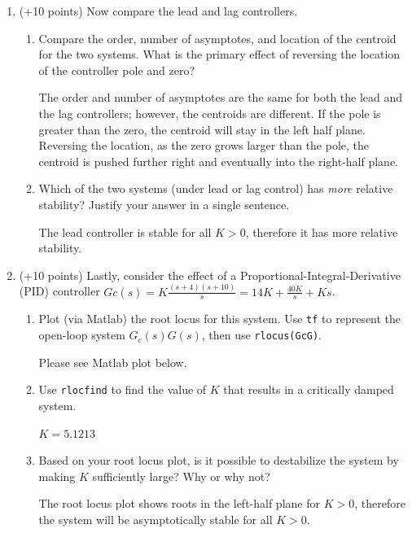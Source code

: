 \documentclass[11pt]{article}
\begin{document}
\begin{enumerate}
    \item (+10 points) Now compare the lead and lag controllers.
        \begin{enumerate}
            \item Compare the order, number of asymptotes, and location of the centroid for the two systems. What is the primary effect of reversing the location of the controller pole and zero?\par
            \color{CrispBlue}
            The order and number of asymptotes are the same for both the lead and the lag controllers; however, the centroids are different. If the pole is greater than the zero, the centroid will stay in the left half plane. Reversing the location, as the zero grows larger than the pole, the centroid is pushed further right and eventually into the right-half plane.
            \color{black}
            \item Which of the two systems (under lead or lag control) has \textit{more} relative stability? Justify your answer in a single sentence.\par
            \color{CrispBlue}
            The lead controller is stable for all \(K>0\), therefore it has more relative stability.
            \color{black}
        \end{enumerate}
    \item (+10 points) Lastly, consider the effect of a Proportional-Integral-Derivative (PID) controller \(Gc(s) = K \displaystyle\frac{(s+4)(s+10)}{s} = 14K + \frac{40K}{s} + Ks\).
        \begin{enumerate}
            \item Plot (via Matlab) the root locus for this system. Use \texttt{tf} to represent the open-loop system \(G_c(s)G(s)\), then use \texttt{rlocus(GcG)}.\par
            \color{CrispBlue}
            Please see Matlab plot below.
            \color{black}
            \item Use \texttt{rlocfind} to find the value of \(K\) that results in a critically damped system.\par
            \color{CrispBlue}
            \(K = 5.1213\)
            \color{black}
            \item Based on your root locus plot, is it possible to destabilize the system by making \(K\) sufficiently large? Why or why not?\par
            \color{CrispBlue}
            The root locus plot shows roots in the left-half plane for \(K>0\), therefore the system will be asymptotically stable for all \(K>0\).
            \color{black}
        \end{enumerate}
\end{enumerate}

\end{document}
